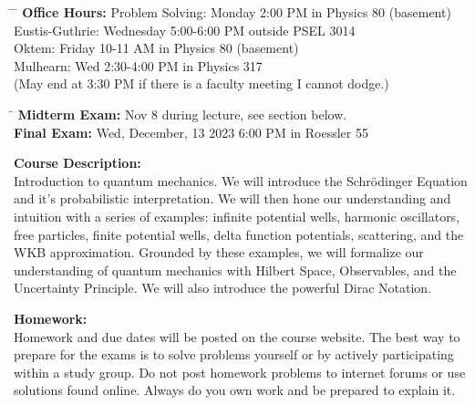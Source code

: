 \documentclass[12pt]{article}
\begin{document}
\begin{tabbing}
\hspace*{8em}\= \hspace*{10em} \= \kill 
\textbf{Office Hours:} \> Problem Solving: \> Monday 2:00 PM in Physics 80 (basement)\\
    \> Eustis-Guthrie: \> Wednesday 5:00-6:00 PM outside PSEL 3014 \\
    \> Oktem: \> Friday 10-11 AM in Physics 80 (basement) \\
    \> Mulhearn: \> Wed 2:30-4:00 PM in Physics 317\\
    \> (May end at 3:30 PM if there is a faculty meeting I cannot dodge.)\\
\end{tabbing}

\noindent
\begin{tabbing}
\hspace*{12em}\= \kill 
\textbf{Midterm Exam:} \> Nov 8 during lecture, see section below.\\
\textbf{Final Exam:} \> Wed, December, 13 2023 6:00 PM in Roessler 55
\end{tabbing}
\noindent
\textbf {Course Description:}\\
Introduction to quantum mechanics.  We will introduce the
Schr\"odinger Equation and it's probabilistic interpretation.  We will
then hone our understanding and intuition with a series of examples:
infinite potential wells, harmonic oscillators, free particles, finite
potential wells, delta function potentials, scattering, and the WKB
approximation.  Grounded by these examples, we will formalize our
understanding of quantum mechanics with Hilbert Space, Observables,
and the Uncertainty Principle.  We will also introduce the powerful
Dirac Notation.\\

\newpage
\noindent

\noindent
\textbf{Homework:}\\
Homework and due dates will be posted on the course website.  The best way to prepare for the exams is to solve problems yourself or by actively participating within a study group.  Do not post homework problems to internet forums or use solutions found online.  Always do you own work and be prepared to explain it.\\
\end{document}
